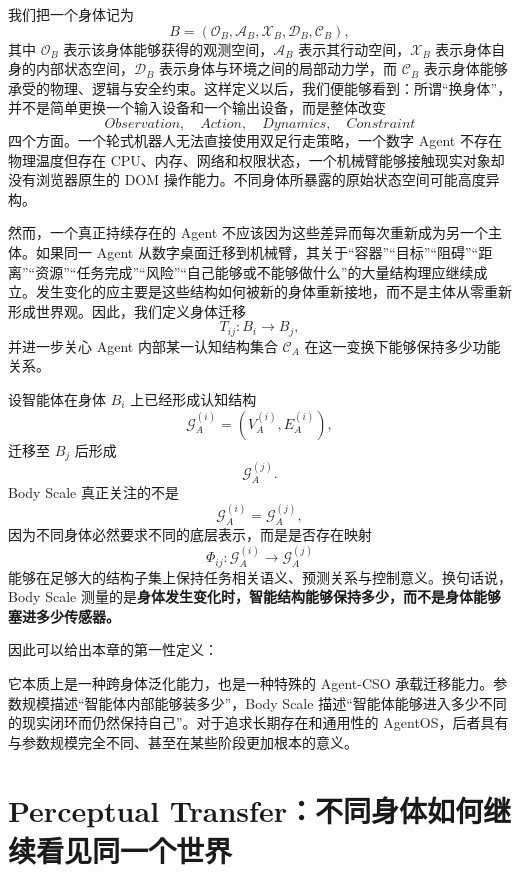 我们把一个身体记为
\[
B=
\left(
\mathcal O_B,
\mathcal A_B,
\mathcal X_B,
\mathcal D_B,
\mathcal C_B
\right),
\]
其中 $\mathcal O_B$ 表示该身体能够获得的观测空间，$\mathcal A_B$ 表示其行动空间，$\mathcal X_B$ 表示身体自身的内部状态空间，$\mathcal D_B$ 表示身体与环境之间的局部动力学，而 $\mathcal C_B$ 表示身体能够承受的物理、逻辑与安全约束。这样定义以后，我们便能够看到：所谓“换身体”，并不是简单更换一个输入设备和一个输出设备，而是整体改变
\[
Observation,\quad Action,\quad Dynamics,\quad Constraint
\]
四个方面。一个轮式机器人无法直接使用双足行走策略，一个数字 Agent 不存在物理温度但存在 CPU、内存、网络和权限状态，一个机械臂能够接触现实对象却没有浏览器原生的 DOM 操作能力。不同身体所暴露的原始状态空间可能高度异构。

然而，一个真正持续存在的 Agent 不应该因为这些差异而每次重新成为另一个主体。如果同一 Agent 从数字桌面迁移到机械臂，其关于“容器”“目标”“阻碍”“距离”“资源”“任务完成”“风险”“自己能够或不能够做什么”的大量结构理应继续成立。发生变化的应主要是这些结构如何被新的身体重新接地，而不是主体从零重新形成世界观。因此，我们定义身体迁移
\[
T_{ij}: B_i\rightarrow B_j,
\]
并进一步关心 Agent 内部某一认知结构集合 $\mathcal C_A$ 在这一变换下能够保持多少功能关系。

设智能体在身体 $B_i$ 上已经形成认知结构
\[
\mathcal G_A^{(i)}
=
(V_A^{(i)},E_A^{(i)}),
\]
迁移至 $B_j$ 后形成
\[
\mathcal G_A^{(j)}.
\]
Body Scale 真正关注的不是
\[
\mathcal G_A^{(i)}
=
\mathcal G_A^{(j)},
\]
因为不同身体必然要求不同的底层表示，而是是否存在映射
\[
\Phi_{ij}:
\mathcal G_A^{(i)}
\rightarrow
\mathcal G_A^{(j)}
\]
能够在足够大的结构子集上保持任务相关语义、预测关系与控制意义。换句话说，Body Scale 测量的是\textbf{身体发生变化时，智能结构能够保持多少，而不是身体能够塞进多少传感器。}

因此可以给出本章的第一性定义：
\begin{statementbox}
\centering
{}
\end{statementbox}
它本质上是一种跨身体泛化能力，也是一种特殊的 Agent-CSO 承载迁移能力。参数规模描述“智能体内部能够装多少”，Body Scale 描述“智能体能够进入多少不同的现实闭环而仍然保持自己”。对于追求长期存在和通用性的 AgentOS，后者具有与参数规模完全不同、甚至在某些阶段更加根本的意义。


\section{Perceptual Transfer：不同身体如何继续看见同一个世界}

